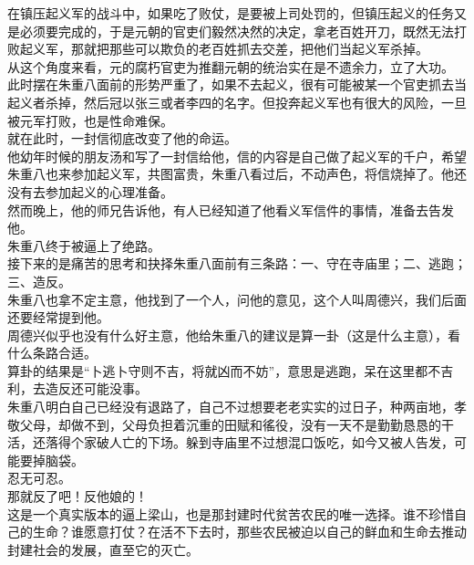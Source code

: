 \begin{multicols}{\theparacolNo}
在镇压起义军的战斗中，如果吃了败仗，是要被上司处罚的，但镇压起义的任务又是必须要完成的，于是元朝的官吏们毅然决然的决定，拿老百姓开刀，既然无法打败起义军，那就把那些可以欺负的老百姓抓去交差，把他们当起义军杀掉。\\

从这个角度来看，元的腐朽官吏为推翻元朝的统治实在是不遗余力，立了大功。\\

此时摆在朱重八面前的形势严重了，如果不去起义，很有可能被某一个官吏抓去当起义者杀掉，然后冠以张三或者李四的名字。但投奔起义军也有很大的风险，一旦被元军打败，也是性命难保。\\

就在此时，一封信彻底改变了他的命运。\\

他幼年时候的朋友汤和写了一封信给他，信的内容是自己做了起义军的千户，希望朱重八也来参加起义军，共图富贵，朱重八看过后，不动声色，将信烧掉了。他还没有去参加起义的心理准备。\\

然而晚上，他的师兄告诉他，有人已经知道了他看义军信件的事情，准备去告发他。\\

朱重八终于被逼上了绝路。\\

接下来的是痛苦的思考和抉择朱重八面前有三条路：一、守在寺庙里；二、逃跑；三、造反。\\

朱重八也拿不定主意，他找到了一个人，问他的意见，这个人叫周德兴，我们后面还要经常提到他。\\

周德兴似乎也没有什么好主意，他给朱重八的建议是算一卦（这是什么主意），看什么条路合适。\\

算卦的结果是“卜逃卜守则不吉，将就凶而不妨”，意思是逃跑，呆在这里都不吉利，去造反还可能没事。\\

朱重八明白自己已经没有退路了，自己不过想要老老实实的过日子，种两亩地，孝敬父母，却做不到，父母负担着沉重的田赋和徭役，没有一天不是勤勤恳恳的干活，还落得个家破人亡的下场。躲到寺庙里不过想混口饭吃，如今又被人告发，可能要掉脑袋。\\

忍无可忍。\\

那就反了吧！反他娘的！\\

这是一个真实版本的逼上梁山，也是那封建时代贫苦农民的唯一选择。谁不珍惜自己的生命？谁愿意打仗？在活不下去时，那些农民被迫以自己的鲜血和生命去推动封建社会的发展，直至它的灭亡。\\


\end{multicols}
